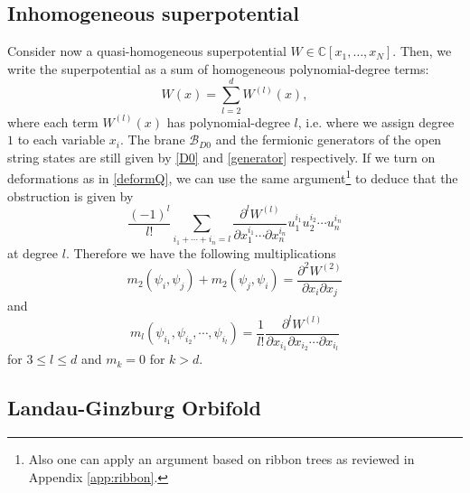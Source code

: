 \documentclass[a4paper,11pt]{article}
\numberwithin{equation}{section}
\begin{document}
\subsection{Inhomogeneous superpotential}

Consider now a quasi-homogeneous superpotential 
$W\in\mathbb{C}[x_{1},\ldots,x_{N}]$. Then, we write the 
superpotential as a sum of homogeneous polynomial-degree terms:
\begin{equation}
W(x) = \sum_{l=2}^d W^{(l)}(x),
\end{equation}
where each term $W^{(l)}(x)$ has polynomial-degree $l$, i.e. where we assign 
degree $1$ to each variable $x_{i}$. The brane $\mathcal{B}_{D0}$ and the 
fermionic generators of the open string states are still given by \eqref{D0} 
and \eqref{generator} respectively. If we turn on deformations as in 
\eqref{deformQ}, we can use the same argument\footnote{Also one can apply an 
argument based on ribbon trees as reviewed in Appendix \ref{app:ribbon}.} to 
deduce that the obstruction is 
given by
\begin{equation}
\frac{(-1)^l}{l!} \sum_{i_1 + \cdots + i_n = l} \frac{\partial^l 
W^{(l)}}{\partial x_1^{i_1} \cdots \partial x_n^{i_n}} u_1^{i_1} u_2^{i_2} 
\cdots u_n^{i_n}
\end{equation}
at degree $l$. Therefore we have the following multiplications
\begin{equation}\label{Af_inhomo1}
m_2 (\psi_i,\psi_j) + m_2(\psi_j,\psi_i) = \frac{\partial^2 W^{(2)}}{\partial 
x_i \partial x_j}
\end{equation}
and
\begin{equation}\label{Af_inhomo2}
m_l (\psi_{i_1},\psi_{i_2},\cdots,\psi_{i_l}) = \frac{1}{l!} \frac{\partial^l 
W^{(l)}}{\partial x_{i_1} \partial x_{i_2} \cdots \partial x_{i_l}}
\end{equation}
for $3 \leq l \leq d$ and $m_k = 0$ for $k>d$.


\subsection{Landau-Ginzburg Orbifold}\label{sec:LGorb}
\end{document}
